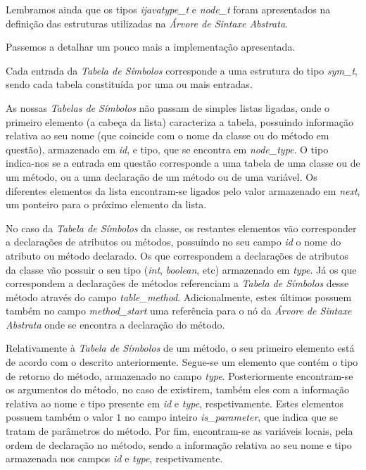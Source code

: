 \documentclass[11pt,a4paper]{article}
\begin{document}
	Lembramos ainda que os tipos \emph{ijavatype\_t} e \emph{node\_t} foram apresentados na definição das estruturas utilizadas na \emph{Árvore de Sintaxe Abstrata}.
	
	Passemos a detalhar um pouco mais a implementação apresentada.
	
	Cada entrada da \emph{Tabela de Símbolos} corresponde a uma estrutura do tipo \emph{sym\_t}, sendo cada tabela constituída por uma ou mais entradas.
	
	As nossas \emph{Tabelas de Símbolos} não passam de simples listas ligadas, onde o primeiro elemento (a cabeça da lista) caracteriza a tabela, possuindo informação relativa ao seu nome (que coincide com o nome da classe ou do método em questão), armazenado em \emph{id}, e tipo, que se encontra em \emph{node\_type}. O tipo indica-nos se a entrada em questão corresponde a uma tabela de uma classe ou de um método, ou a uma declaração de um método ou de uma variável. Os diferentes elementos da lista encontram-se ligados pelo valor armazenado em \emph{next}, um ponteiro para o próximo elemento da lista.
	
	No caso da \emph{Tabela de Símbolos} da classe, os restantes elementos vão corresponder a declarações de atributos ou métodos, possuindo no seu campo \emph{id} o nome do atributo ou método declarado. Os que correspondem a declarações de atributos da classe vão possuir o seu tipo (\emph{int}, \emph{boolean}, etc) armazenado em \emph{type}. Já os que correspondem a declarações de métodos referenciam a \emph{Tabela de Símbolos} desse método através do campo  \emph{table\_method}. Adicionalmente, estes últimos possuem também no campo \emph{method\_start} uma referência para o nó da \emph{Árvore de Sintaxe Abstrata} onde se encontra a declaração do método.
	
	Relativamente à \emph{Tabela de Símbolos} de um método, o seu primeiro elemento está de acordo com o descrito anteriormente. Segue-se um elemento que contém o tipo de retorno do método, armazenado no campo \emph{type}. Posteriormente encontram-se os argumentos do método, no caso de existirem, também eles com a informação relativa ao nome e tipo presente em \emph{id} e \emph{type}, respetivamente. Estes elementos possuem também o valor $1$ no campo inteiro \emph{is\_parameter}, que indica que se tratam de parâmetros do método. Por fim, encontram-se as variáveis locais, pela ordem de declaração no método, sendo a informação relativa ao seu nome e tipo armazenada nos campos \emph{id} e \emph{type}, respetivamente.
	
\end{document}
